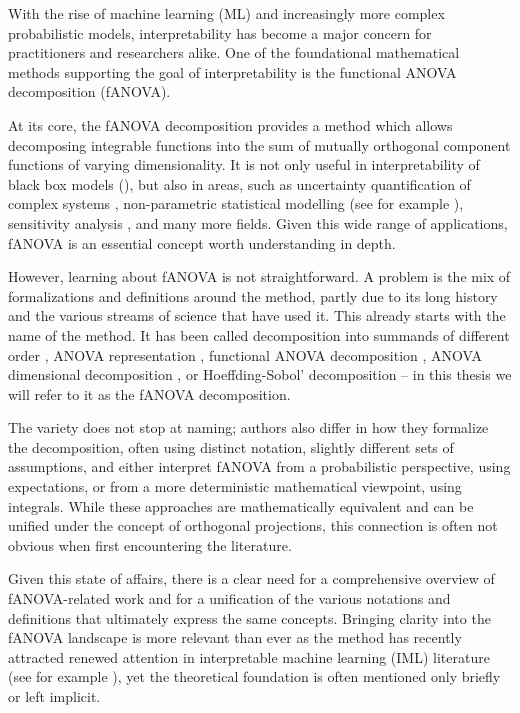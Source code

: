 With the rise of machine learning (ML) and increasingly more complex probabilistic models, interpretability has become a major concern for practitioners and researchers alike. One of the foundational mathematical methods supporting the goal of interpretability is the functional ANOVA decomposition (fANOVA).

At its core, the fANOVA decomposition provides a method which allows decomposing integrable functions into the sum of mutually orthogonal component functions of varying dimensionality.
It is not only useful in interpretability of black box models (\cite{hooker2004, molnar2025}), but also in areas, such as uncertainty quantification of complex systems \citep{rahman2014}, non-parametric statistical modelling (see for example \cite{stone1997}), sensitivity analysis \citep{sobol1993sensitivity}, and many more fields.
Given this wide range of applications, fANOVA is an essential concept worth understanding in depth.

However, learning about fANOVA is not straightforward. A problem is the mix of formalizations and definitions around the method, partly due to its long history and the various streams of science that have used it.
This already starts with the name of the method. It has been called decomposition into summands of different order \citep{sobol1993sensitivity}, ANOVA representation \citep{sobol2001}, functional ANOVA decomposition \citep{hooker2004}, ANOVA dimensional decomposition \citep{rahman2014}, or Hoeffding-Sobol' decomposition \citep{chastaing2012} – in this thesis we will refer to it as the fANOVA decomposition.

The variety does not stop at naming; authors also differ in how they formalize the decomposition, often using distinct notation, slightly different sets of assumptions, and either interpret fANOVA from a probabilistic perspective, using expectations, or from a more deterministic mathematical viewpoint, using integrals.
While these approaches are mathematically equivalent and can be unified under the concept of orthogonal projections, this connection is often not obvious when first encountering the literature.

Given this state of affairs, there is a clear need for a comprehensive overview of fANOVA-related work and for a unification of the various notations and definitions that ultimately express the same concepts.
Bringing clarity into the fANOVA landscape is more relevant than ever as the method has recently attracted renewed attention in interpretable machine learning (IML) literature (see for example \cite{hu2025}), yet the theoretical foundation is often mentioned only briefly or left implicit.

